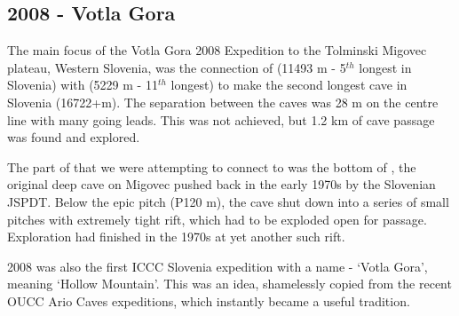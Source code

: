 \begin{tcolorbox}
\chapter{2008 - Votla Gora}

The main focus of the Votla Gora 2008 Expedition to the Tolminski
Migovec plateau, Western Slovenia, was the connection of 
(11493 m - 5\(^{th}\) longest in Slovenia) with  (5229 m
- 11\(^{th}\) longest) to make the second longest cave in Slovenia
(16722+m). The separation between the caves was 28 m on the centre line
with many going leads. This was not achieved, but 1.2 km of cave passage
was found and explored.

The part of  that we were attempting to connect to was the
bottom of , the original deep cave on Migovec pushed back in
the early 1970s by the Slovenian JSPDT. Below the epic  pitch (P120 m), the cave shut down into a series of small pitches
with extremely tight rift, which had to be exploded open for passage.
Exploration had finished in the 1970s at yet another such rift.

2008 was also the first ICCC Slovenia expedition with a name - `Votla
Gora', meaning `Hollow Mountain'. This was an idea, shamelessly copied
from the recent OUCC Ario Caves expeditions, which instantly became a
useful tradition.

\end{tcolorbox}
